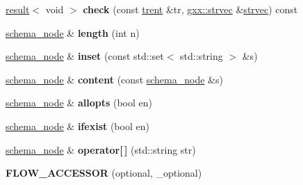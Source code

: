 \begin{DoxyCompactItemize}
\item 
\hyperlink{classgxx_1_1result__type_1_1result}{result}$<$ void $>$ {\bfseries check} (const \hyperlink{classgxx_1_1trent}{trent} \&tr, \hyperlink{classgxx_1_1vector}{gxx\+::strvec} \&\hyperlink{classgxx_1_1vector}{strvec}) const \hypertarget{classgxx_1_1schema_1_1schema__node_a8880383bb1bf7f785fd734ec39d13b56}{}\label{classgxx_1_1schema_1_1schema__node_a8880383bb1bf7f785fd734ec39d13b56}

\item 
\hyperlink{classgxx_1_1schema_1_1schema__node}{schema\+\_\+node} \& {\bfseries length} (int n)\hypertarget{classgxx_1_1schema_1_1schema__node_a12a6d422821313a1ca2dd54f46f1979c}{}\label{classgxx_1_1schema_1_1schema__node_a12a6d422821313a1ca2dd54f46f1979c}

\item 
\hyperlink{classgxx_1_1schema_1_1schema__node}{schema\+\_\+node} \& {\bfseries inset} (const std\+::set$<$ std\+::string $>$ \&s)\hypertarget{classgxx_1_1schema_1_1schema__node_a53816fc8eb7d85ee327fc346a635b248}{}\label{classgxx_1_1schema_1_1schema__node_a53816fc8eb7d85ee327fc346a635b248}

\item 
\hyperlink{classgxx_1_1schema_1_1schema__node}{schema\+\_\+node} \& {\bfseries content} (const \hyperlink{classgxx_1_1schema_1_1schema__node}{schema\+\_\+node} \&s)\hypertarget{classgxx_1_1schema_1_1schema__node_ad8f3c948781eeeb94d6ddaefc1e1e3a8}{}\label{classgxx_1_1schema_1_1schema__node_ad8f3c948781eeeb94d6ddaefc1e1e3a8}

\item 
\hyperlink{classgxx_1_1schema_1_1schema__node}{schema\+\_\+node} \& {\bfseries allopts} (bool en)\hypertarget{classgxx_1_1schema_1_1schema__node_af3263eb46e3e55bfa55641a9c779f90e}{}\label{classgxx_1_1schema_1_1schema__node_af3263eb46e3e55bfa55641a9c779f90e}

\item 
\hyperlink{classgxx_1_1schema_1_1schema__node}{schema\+\_\+node} \& {\bfseries ifexist} (bool en)\hypertarget{classgxx_1_1schema_1_1schema__node_a6df654f68090ac8e4cbb3f587f13562c}{}\label{classgxx_1_1schema_1_1schema__node_a6df654f68090ac8e4cbb3f587f13562c}

\item 
\hyperlink{classgxx_1_1schema_1_1schema__node}{schema\+\_\+node} \& {\bfseries operator\mbox{[}$\,$\mbox{]}} (std\+::string str)\hypertarget{classgxx_1_1schema_1_1schema__node_a6787e871a222db52716138a10e12b50d}{}\label{classgxx_1_1schema_1_1schema__node_a6787e871a222db52716138a10e12b50d}

\item 
{\bfseries F\+L\+O\+W\+\_\+\+A\+C\+C\+E\+S\+S\+OR} (optional, \+\_\+optional)\hypertarget{classgxx_1_1schema_1_1schema__node_ac08ccc3536329afb83adf9643be2fa79}{}\label{classgxx_1_1schema_1_1schema__node_ac08ccc3536329afb83adf9643be2fa79}

\end{DoxyCompactItemize}
